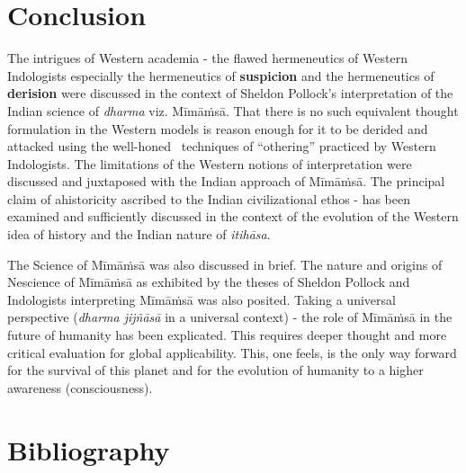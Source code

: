 \section*{Conclusion}

The intrigues of Western academia - the flawed hermeneutics of Western Indologists especially the hermeneutics of \textbf{suspicion} and the hermeneutics of \textbf{derision} were discussed in the context of Sheldon Pollock’s interpretation of the Indian science of \textit{dharma} viz. Mīmāṁsā. That there is no such equivalent thought formulation in the Western models is reason enough for it to be derided and attacked using the well-honed  techniques of “othering” practiced by Western Indologists. The limitations of the Western notions of interpretation were discussed and juxtaposed with the Indian approach of Mīmāṁsā. The principal claim of ahistoricity ascribed to the Indian civilizational ethos - has been examined and sufficiently discussed in the context of the evolution of the Western idea of history and the Indian nature of \textit{itihāsa}.

The Science of Mīmāṁsā was also discussed in brief. The nature and origins of Nescience of Mīmāṁsā as exhibited by the theses of Sheldon Pollock and Indologists interpreting Mīmāṁsā was also posited. Taking a universal perspective (\textit{dharma jijñāsā} in a universal context) - the role of Mīmāṁsā in the future of humanity has been explicated. This requires deeper thought and more critical evaluation for global applicability. This, one feels, is the only way forward for the survival of this planet and for the evolution of humanity to a higher awareness (consciousness).


\section*{Bibliography}

